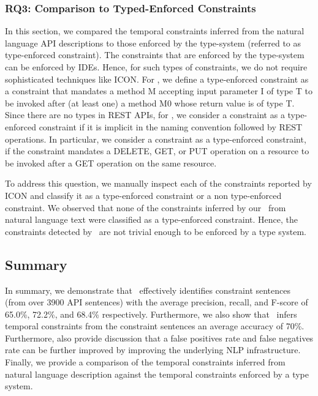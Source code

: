 \subsubsection{RQ3: Comparison to Typed-Enforced Constraints}

In this section, we compared the temporal constraints inferred from the natural language API descriptions to those enforced by the type-system (referred to as type-enforced constraint). The constraints that are enforced by the type-system can be enforced by IDEs. Hence, for such types of constraints, we do not require sophisticated techniques like ICON. 
For , we define a type-enforced constraint as a constraint that mandates a method M accepting input parameter I of type T to be invoked after (at least one) a method M0 whose return value is of type T. 
Since there are no types in REST APIs, for , we consider a constraint as a type-enforced constraint if it is implicit in the  naming convention followed by REST operations. In particular, we consider a constraint as a type-enforced constraint, if the constraint mandates a DELETE, GET, or PUT operation on a resource to be invoked after a GET operation on the same resource. 

To address this question, we manually inspect each of the constraints reported by ICON and classify it as a type-enforced constraint or a non type-enforced constraint. 
We observed that none of the constraints inferred by our \tool\ from natural language text were classified as a type-enforced constraint. Hence, the constraints detected by \tool\ are not trivial enough to be enforced by a type system.




\subsection{Summary}
\label{sub:summary}

In summary, we demonstrate that \tool\ effectively identifies constraint sentences (from over 3900 API sentences) with the average precision, recall, and F-score of 65.0\%, 72.2\%, and 68.4\% respectively. Furthermore, we also show that \tool\ infers temporal constraints from the constraint sentences an average accuracy of 70\%. Furthermore, also provide discussion that a false positives rate and false negatives rate can be further improved by improving the underlying NLP infrastructure. Finally, we provide a comparison of the temporal constraints inferred from natural language description against the temporal constraints enforced by a type system. 


